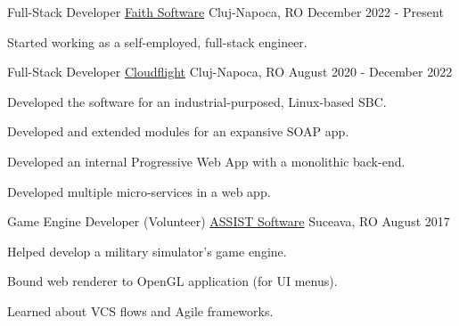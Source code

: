 

\begin{cventries}

  \cventry
  {Full-Stack Developer}
  {\href{https://faith.software}{Faith Software}}
  {Cluj-Napoca, RO}
  {December 2022 - Present}
  {
    \begin{cvitems}
      \item {Started working as a self-employed, full-stack engineer.}
    \end{cvitems}
  }

  \cventry
  {Full-Stack Developer}
  {\href{https://cloudflight.io}{Cloudflight}}
  {Cluj-Napoca, RO}
  {August 2020 - December 2022}
  {
    \begin{cvitems}
      \item {Developed the software for an industrial-purposed, Linux-based SBC.}
      \item {Developed and extended modules for an expansive SOAP app.}
      \item {Developed an internal Progressive Web App with a monolithic back-end.}
      \item {Developed multiple micro-services in a web app.}
    \end{cvitems}
  }

  \cventry
  {Game Engine Developer (Volunteer)}
  {\href{https://assist-software.net/}{ASSIST Software}}
  {Suceava, RO}
  {August 2017}
  {
    \begin{cvitems}
      \item {Helped develop a military simulator's game engine.}
      \item {Bound web renderer to OpenGL application (for UI menus).}
      \item {Learned about VCS flows and Agile frameworks.}
    \end{cvitems}
  }

\end{cventries}